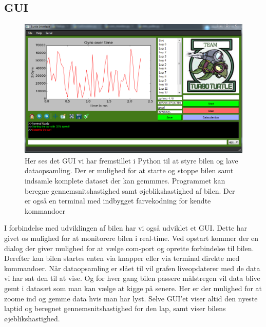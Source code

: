 \subsection{GUI}

\begin{figure}[h]
	\centering
		\includegraphics[scale=0.60]{Billeder/Application.PNG}
	\caption{Her ses det GUI vi har fremstillet i Python til at styre bilen og lave dataopsamling. Der er mulighed for at 				starte og stoppe bilen samt indsamle komplete dataset der kan gemmmes. Programmet kan beregne gennemsnitshastighed 				samt øjeblikshastighed af bilen. Der er også en terminal med indbygget farvekodning for kendte kommandoer}
	\label{fig:Application}
\end{figure}

I forbindelse med udviklingen af bilen har vi også udviklet et GUI. Dette har givet os mulighed for at monitorere bilen i real-time. Ved opstart kommer der en dialog der giver mulighed for at vælge com-port og oprette forbindelse til bilen. Derefter kan bilen startes enten via knapper eller via terminal direkte med kommandoer. Når dataopsamling er slået til vil grafen liveopdaterer med de data vi har sat den til at vise. Og for hver gang bilen passere målstregen vil data blive gemt i datasæt som man kan vælge at kigge på senere. Her er der mulighed for at zoome ind og gemme data hvis man har lyst. Selve GUI'et viser altid den nyeste laptid og beregnet gennemsnitshastighed for den lap, samt viser bilens øjeblikshastighed.

